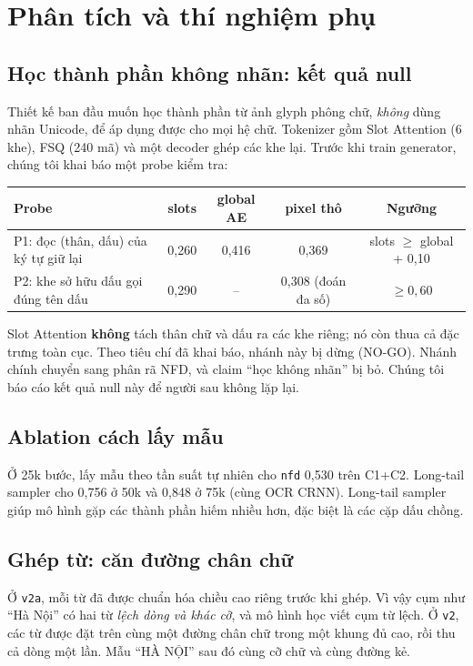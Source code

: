 \documentclass[11pt,a4paper]{article}
\begin{document}
\FloatBarrier
\section{Phân tích và thí nghiệm phụ}
\label{sec:analysis}

\subsection{Học thành phần không nhãn: kết quả null}
\label{sec:stage1}
Thiết kế ban đầu muốn học thành phần từ ảnh glyph phông chữ, \emph{không} dùng nhãn Unicode, để áp dụng được cho mọi hệ chữ. Tokenizer gồm Slot Attention (6 khe), FSQ (240 mã) và một decoder ghép các khe lại. Trước khi train generator, chúng tôi khai báo một probe kiểm tra:

\begin{center}\small
\begin{tabular}{lcccc}
\toprule
Probe & slots & global AE & pixel thô & Ngưỡng \\
\midrule
P1: đọc (thân, dấu) của ký tự giữ lại & 0,260 & 0,416 & 0,369 & slots $\ge$ global + 0,10 \\
P2: khe sở hữu dấu gọi đúng tên dấu & 0,290 & -- & 0,308 (đoán đa số) & $\ge 0{,}60$ \\
\bottomrule
\end{tabular}
\end{center}

Slot Attention \textbf{không} tách thân chữ và dấu ra các khe riêng; nó còn thua cả đặc trưng toàn cục. Theo tiêu chí đã khai báo, nhánh này bị dừng (NO-GO). Nhánh chính chuyển sang phân rã NFD, và claim ``học không nhãn'' bị bỏ. Chúng tôi báo cáo kết quả null này để người sau không lặp lại.

\subsection{Ablation cách lấy mẫu}
Ở 25k bước, lấy mẫu theo tần suất tự nhiên cho \texttt{nfd} 0,530 trên C1+C2. Long-tail sampler cho 0,756 ở 50k và 0,848 ở 75k (cùng OCR CRNN). Long-tail sampler giúp mô hình gặp các thành phần hiếm nhiều hơn, đặc biệt là các cặp dấu chồng.

\subsection{Ghép từ: căn đường chân chữ}
Ở \texttt{v2a}, mỗi từ đã được chuẩn hóa chiều cao riêng trước khi ghép. Vì vậy cụm như ``Hà Nội'' có hai từ \emph{lệch dòng và khác cỡ}, và mô hình học viết cụm từ lệch. Ở \texttt{v2}, các từ được đặt trên cùng một đường chân chữ trong một khung đủ cao, rồi thu cả dòng một lần. Mẫu ``HÀ NỘI'' sau đó cùng cỡ chữ và cùng đường kẻ.
\end{document}
